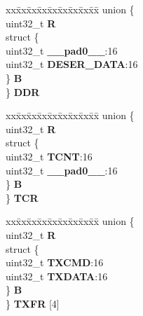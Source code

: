 \begin{DoxyCompactItemize}
\begin{tabbing}
\end{tabbing}\item 
\mbox{\label{structDSPI__tag_a72b74b2878690901396a4a077b481671}} 
\begin{tabbing}
xx\=xx\=xx\=xx\=xx\=xx\=xx\=xx\=xx\=\kill
union \{\\
\>uint32\_t {\bfseries R}\\
\>struct \{\\
\>\>uint32\_t {\bfseries \_\_pad0\_\_}:16\\
\>\>uint32\_t {\bfseries DESER\_DATA}:16\\
\>\} {\bfseries B}\\
\} {\bfseries DDR}\\

\end{tabbing}\item 
\mbox{\label{structDSPI__tag_a7416bf5975ab28b35a87c15176af5b1e}} 
\begin{tabbing}
xx\=xx\=xx\=xx\=xx\=xx\=xx\=xx\=xx\=\kill
union \{\\
\>uint32\_t {\bfseries R}\\
\>struct \{\\
\>\>uint32\_t {\bfseries TCNT}:16\\
\>\>uint32\_t {\bfseries \_\_pad0\_\_}:16\\
\>\} {\bfseries B}\\
\} {\bfseries TCR}\\

\end{tabbing}\item 
\mbox{\label{structDSPI__tag_ad1e98bfe7f9d9bc1e4e599bc1a081084}} 
\begin{tabbing}
xx\=xx\=xx\=xx\=xx\=xx\=xx\=xx\=xx\=\kill
union \{\\
\>uint32\_t {\bfseries R}\\
\>struct \{\\
\>\>uint32\_t {\bfseries TXCMD}:16\\
\>\>uint32\_t {\bfseries TXDATA}:16\\
\>\} {\bfseries B}\\
\} {\bfseries TXFR} \mbox{[}4\mbox{]}\\


\end{tabbing}
\end{DoxyCompactItemize}
